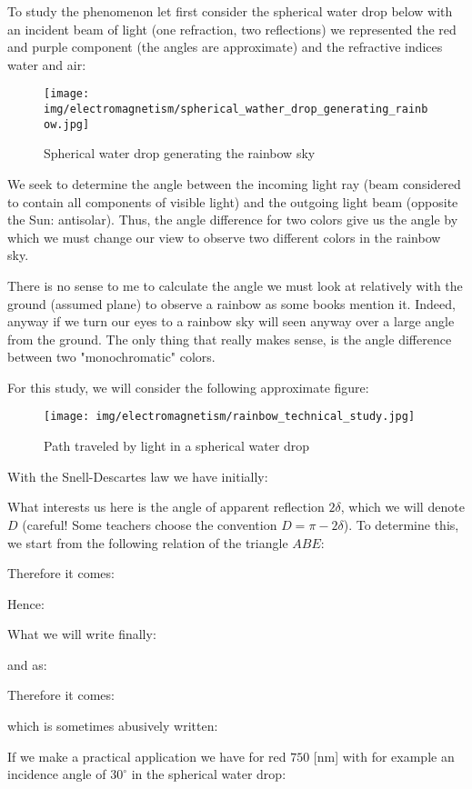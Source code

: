 	To study the phenomenon let first consider the spherical water drop below with an incident beam of light (one refraction, two reflections) we represented the red and purple component (the angles are approximate) and the refractive indices water and air:
	\begin{figure}[H]
		\centering
		\texttt{[image: img/electromagnetism/spherical\_wather\_drop\_generating\_rainbow.jpg]}
		\caption[]{Spherical water drop generating the rainbow sky}
	\end{figure}
	We seek to determine the angle between the incoming light ray (beam considered to contain all components of visible light) and the outgoing light beam (opposite the Sun: antisolar). Thus, the angle difference for two colors give us the angle by which we must change our view to observe two different colors in the rainbow sky.
	\begin{tcolorbox}[title=Remark,colframe=black,arc=10pt]
	There is no sense to me to calculate the angle we must look at relatively with the ground (assumed plane) to observe a rainbow as some books mention it. Indeed, anyway if we turn our eyes to a rainbow sky will seen anyway over a large angle from the ground. The only thing that really makes sense, is the angle difference between two "monochromatic" colors.
	\end{tcolorbox}
	For this study, we will consider the following approximate figure:
	\begin{figure}[H]
		\centering
		\texttt{[image: img/electromagnetism/rainbow\_technical\_study.jpg]}
		\caption[]{Path traveled by light in a spherical water drop}
	\end{figure}
	With the Snell-Descartes law we have initially:
	
	What interests us here is the angle of apparent reflection $2\delta$, which we will denote $D$ (careful! Some teachers choose the convention $D=\pi-2\delta$). To determine this, we start from the following relation of the triangle $ABE$:
	
	Therefore it comes:
	
	Hence:
	
	What we will write finally:
	
	and as:
	
	Therefore it comes:
	
	which is sometimes abusively written:
	
	If we make a practical application we have for red $750$ [nm] with for example an incidence angle of $30^\circ$ in the spherical water drop:
	

